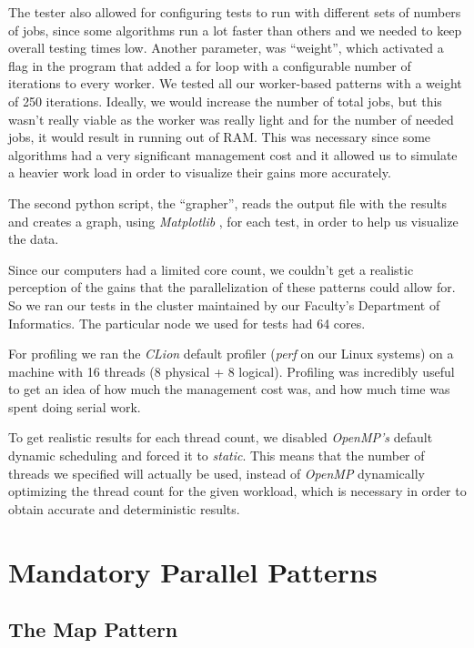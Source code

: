 \documentclass[10pt,journal]{IEEEtran}
\begin{document}
The tester also allowed for configuring tests to run with different sets of numbers of jobs, since some algorithms run a lot faster than others and we needed to keep overall testing times low.  Another parameter, was “weight”, which activated a flag in the program that added a for loop with a configurable number of iterations to every worker. We tested all our worker-based patterns with a weight of 250 iterations. Ideally, we would increase the number of total jobs, but this wasn't really viable as the worker was really light and for the number of needed jobs, it would result in running out of RAM. This was necessary since some algorithms had a very significant management cost and it allowed us to simulate a heavier work load in order to visualize their gains more accurately. 

The second python script, the “grapher”, reads the output file with the results and creates a graph, using \textit{Matplotlib} \cite{matplotlib}, for each test, in order to help us visualize the data. 

Since our computers had a limited core count, we couldn’t get a realistic perception of the gains that the parallelization of these patterns could allow for. So we ran our tests in the cluster maintained by our Faculty’s Department of Informatics. The particular node we used for tests had 64 cores. 

For profiling we ran the \textit{CLion} default profiler (\textit{perf} on our Linux systems) on a machine with 16 threads (8 physical + 8 logical). Profiling was incredibly useful to get an idea of how much the management cost was, and how much time was spent doing serial work.

To get realistic results for each thread count, we disabled \textit{OpenMP's} default dynamic scheduling and forced it to \textit{static}. This means that the number of threads we specified will actually be used, instead of \textit{OpenMP} dynamically optimizing the thread count for the given workload, which is necessary in order to obtain accurate and deterministic results.

\section{Mandatory Parallel Patterns}

\subsection{The Map Pattern}
\label{map}
\end{document}
